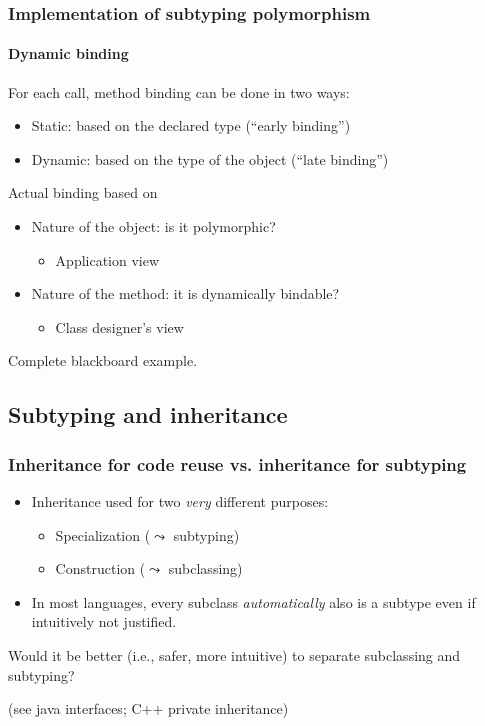 \documentclass{beamer}
\begin{document}
\begin{frame}[fragile]
\frametitle{Implementation of subtyping polymorphism}
\framesubtitle{Dynamic binding}
For each call, method binding can be done in two ways:
\begin{itemize}
\item Static: based on the declared type (``early binding'')
\item Dynamic: based on the type of the object  (``late binding'')
\end{itemize}
\bigskip


Actual binding based on
\begin{itemize}
\item Nature of the object: is it polymorphic?
\begin{itemize}
\item Application view
\end{itemize}
\item Nature of the method: it is dynamically bindable?
\begin{itemize}
\item Class designer's view
\end{itemize}
\end{itemize}

Complete blackboard example.

\end{frame}



\subsection{Subtyping and inheritance}



\begin{frame}[fragile]
\frametitle{Inheritance for code reuse vs. inheritance for subtyping}

\begin{itemize}
\item  Inheritance used for two \textit{very}
different purposes:
\begin{itemize}
\item Specialization ($\leadsto$ subtyping)
\item Construction   ($\leadsto$ subclassing)
\end{itemize}
\item In most languages, every subclass 
\textit{automatically} also is a  subtype even if
intuitively not justified. 
\end{itemize}


\bigskip

Would it be better (i.e., safer, more intuitive) 
to separate subclassing and subtyping? 

(see java interfaces; C++ private inheritance)

\end{frame}
\end{document}
